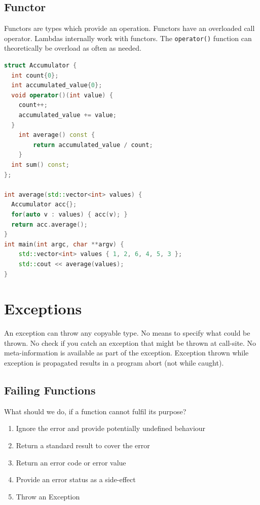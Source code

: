 \subsection{Functor}
Functors are types which provide an operation. Functors have an overloaded call operator. Lambdas internally work with functors. The \lstinline|operator()| function can theoretically be overload as often as needed.
\begin{lstlisting}[language=C++]
struct Accumulator {
  int count{0};
  int accumulated_value{0};
  void operator()(int value) {
    count++;
    accumulated_value += value;
  }
	int average() const {
		return accumulated_value / count;
	}
  int sum() const;
};

int average(std::vector<int> values) {
  Accumulator acc{};
  for(auto v : values) { acc(v); }
  return acc.average();
}
int main(int argc, char **argv) {
	std::vector<int> values { 1, 2, 6, 4, 5, 3 };
	std::cout << average(values);
}
\end{lstlisting}


\pagebreak
\section{Exceptions}
An exception can throw any copyable type. No means to specify what could be thrown. No check if you catch an exception that might be thrown at call-site. No meta-information is available as part of the exception. Exception thrown while exception is propagated results in a program abort (not while caught). 

\subsection{Failing Functions}
What should we do, if a function cannot fulfil its purpose?
\begin{enumerate}
  \itemsep -0.5em 
  \item Ignore the error and provide potentially undefined behaviour
  \item Return a standard result to cover the error
  \item Return an error code or error value
  \item Provide an error status as a side-effect
  \item Throw an Exception
\end{enumerate}

